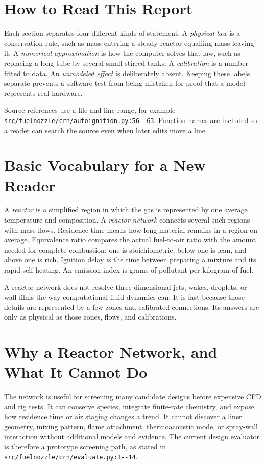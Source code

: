 \documentclass[11pt]{article}
\newcommand{\srcline}[2]{\nolinkurl{#1:#2}}
\begin{document}
\section{How to Read This Report}

Each section separates four different kinds of statement. A \emph{physical law} is a
conservation rule, such as mass entering a steady reactor equalling mass leaving it. A
\emph{numerical approximation} is how the computer solves that law, such as replacing a
long tube by several small stirred tanks. A \emph{calibration} is a number fitted to data.
An \emph{unmodeled effect} is deliberately absent. Keeping these labels separate prevents a
software test from being mistaken for proof that a model represents real hardware.

Source references use a file and line range, for example
\srcline{src/fuelnozzle/crn/autoignition.py}{56--63}. Function names are included so a
reader can search the source even when later edits move a line.

\section{Basic Vocabulary for a New Reader}

A \emph{reactor} is a simplified region in which the gas is represented by one average
temperature and composition. A \emph{reactor network} connects several such regions with
mass flows. Residence time means how long material remains in a region on average.
Equivalence ratio compares the actual fuel-to-air ratio with the amount needed for complete
combustion: one is stoichiometric, below one is lean, and above one is rich. Ignition delay
is the time between preparing a mixture and its rapid self-heating. An emission index is
grams of pollutant per kilogram of fuel.

A reactor network does not resolve three-dimensional jets, wakes, droplets, or wall films
the way computational fluid dynamics can. It is fast because those details are represented
by a few zones and calibrated connections. Its answers are only as physical as those zones,
flows, and calibrations.

\section{Why a Reactor Network, and What It Cannot Do}

The network is useful for screening many candidate designs before expensive CFD and rig
tests. It can conserve species, integrate finite-rate chemistry, and expose how residence
time or air staging changes a trend. It cannot discover a liner geometry, mixing pattern,
flame attachment, thermoacoustic mode, or spray-wall interaction without additional models
and evidence. The current design evaluator is therefore a prototype screening path, as
stated in \srcline{src/fuelnozzle/crn/evaluate.py}{1--14}.
\end{document}
